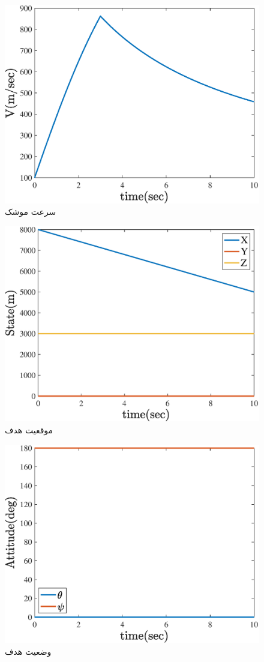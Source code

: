 \begin{figure}[H]
	\centering
	\includegraphics[width=.75\linewidth]{../Figure/a/missle_V}
	\caption{سرعت موشک}
\end{figure}

\begin{figure}[H]
	\centering
	\includegraphics[width=.75\linewidth]{../Figure/a/target_state}
	\caption{موقعیت هدف}
\end{figure}

\begin{figure}[H]
	\centering
	\includegraphics[width=.75\linewidth]{../Figure/a/target_attitude}
	\caption{وضعیت هدف}
\end{figure}

